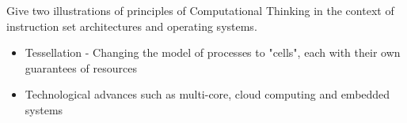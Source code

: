 \documentclass{exam}
\begin{document}
\begin{questions}
\question[2]Give two illustrations of principles of Computational Thinking in the context of instruction set architectures and operating systems.
\begin{solution}[2in]
	\begin{itemize}
		\item Tessellation - Changing the model of processes to "cells", each with their own guarantees of resources
		\item Technological advances such as multi-core, cloud computing and embedded systems
	\end{itemize}
\end{solution}


\end{questions}
\end{document}
